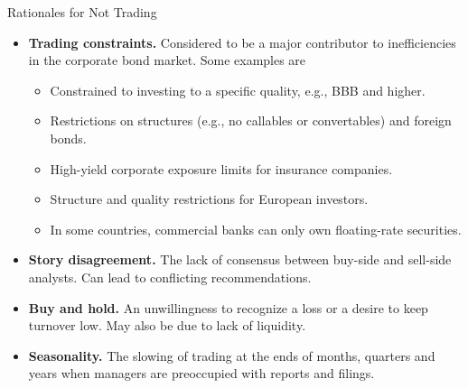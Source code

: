 \documentclass[../custom]{flashcards}
\begin{document}
\begin{flashcard}{Rationales for Not Trading}
    \begin{itemize}
        \item \textbf{Trading constraints.} Considered to be a major contributor to inefficiencies in the corporate bond market. Some examples are
            \begin{itemize}
                \item Constrained to investing to a specific quality, e.g., BBB and higher.
                \item Restrictions on structures (e.g., no callables or convertables) and foreign bonds.
                \item High-yield corporate exposure limits for insurance companies.
                \item Structure and quality restrictions for European investors.
                \item In some countries, commercial banks can only own floating-rate securities.
            \end{itemize}
        \item \textbf{Story disagreement.} The lack of consensus between buy-side and sell-side analysts. Can lead to conflicting recommendations.
        \item \textbf{Buy and hold.} An unwillingness to recognize a loss or a desire to keep turnover low. May also be due to lack of liquidity.
        \item \textbf{Seasonality.} The slowing of trading at the ends of months, quarters and years when managers are preoccupied with reports and filings.
    \end{itemize}
\end{flashcard}
\end{document}
